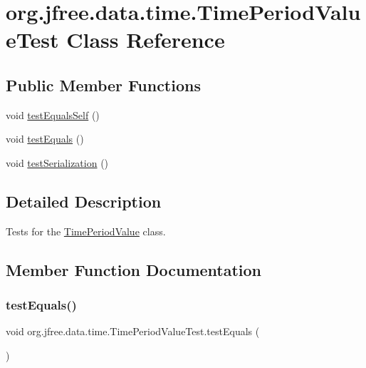 \hypertarget{classorg_1_1jfree_1_1data_1_1time_1_1_time_period_value_test}{}\section{org.\+jfree.\+data.\+time.\+Time\+Period\+Value\+Test Class Reference}
\label{classorg_1_1jfree_1_1data_1_1time_1_1_time_period_value_test}
\subsection*{Public Member Functions}
\begin{DoxyCompactItemize}
\item 
void \mbox{\hyperlink{classorg_1_1jfree_1_1data_1_1time_1_1_time_period_value_test_a6adee1ec48d2f2cfa4b61f7467625f76}{test\+Equals\+Self}} ()
\item 
void \mbox{\hyperlink{classorg_1_1jfree_1_1data_1_1time_1_1_time_period_value_test_a8fc1886d71cdd48c02a5ed75d8a4b39b}{test\+Equals}} ()
\item 
void \mbox{\hyperlink{classorg_1_1jfree_1_1data_1_1time_1_1_time_period_value_test_ad500e44d91a366eeaabfcffaf6c50241}{test\+Serialization}} ()
\end{DoxyCompactItemize}


\subsection{Detailed Description}
Tests for the \mbox{\hyperlink{classorg_1_1jfree_1_1data_1_1time_1_1_time_period_value}{Time\+Period\+Value}} class. 

\subsection{Member Function Documentation}
\mbox{\label{classorg_1_1jfree_1_1data_1_1time_1_1_time_period_value_test_a8fc1886d71cdd48c02a5ed75d8a4b39b}} 
\subsubsection{\texorpdfstring{test\+Equals()}{testEquals()}}
{\footnotesize\ttfamily void org.\+jfree.\+data.\+time.\+Time\+Period\+Value\+Test.\+test\+Equals (\begin{DoxyParamCaption}{ }\end{DoxyParamCaption})}

